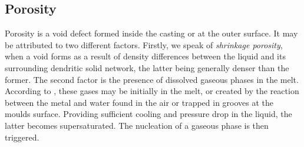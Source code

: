 \subsection*{Porosity}
%
Porosity is a void defect formed inside the casting or at the outer surface. It may be attributed to two different factors.
Firstly, we speak of \emph{shrinkage porosity}, when a void forms as a result of density 
differences between the liquid and its surrounding dendritic solid network, the latter being generally denser 
than the former.
The second factor is the presence of dissolved gaseous phases in the melt. 
According to \citet{dantzig_solidification_2009}, these gases may be initially in the melt, or created by the 
reaction between the metal and water found in the air or trapped in grooves at the moulds surface. Providing sufficient cooling
and pressure drop in the liquid, the latter becomes supersaturated. 
The nucleation of a gaseous phase is then triggered.
%
%
%
